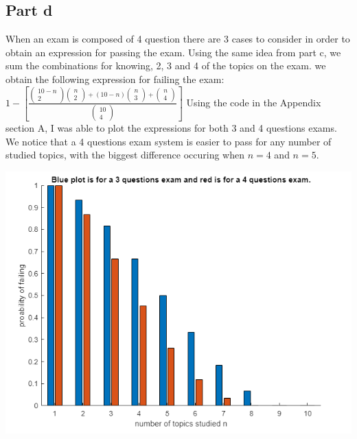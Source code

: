 \documentclass[10pt]{article}
\begin{document}
\subsection*{Part d}
When an exam is composed of 4 question there are 3 cases to consider in order to obtain an expression for passing the exam.
Using the same idea from part c, we sum the combinations for knowing, 2, 3 and 4 of the topics on the exam. we obtain the following expression for failing the exam: $1 - [\frac{\begin{pmatrix} 10 - n \\ 2 \end{pmatrix}\begin{pmatrix} n \\ 2 \end{pmatrix}+(10 - n)\begin{pmatrix} n \\ 3 \end{pmatrix} + \begin{pmatrix} n \\ 4 \end{pmatrix}}{\begin{pmatrix} 10 \\ 4 \end{pmatrix}}]$
Using the code in the Appendix section A,  I was able to plot the expressions for both 3 and 4 questions exams. We notice that
a 4 questions exam system is easier to pass for any number of studied topics, with the biggest difference
occuring when $ n = 4 $ and $ n = 5 $.
\begin{center}
    \includegraphics[scale=0.4]{final_1}
\end{center}
\end{document}
